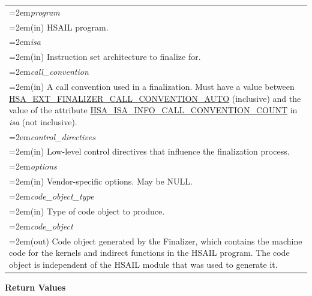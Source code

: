 \documentclass[final,oneside]{book}
\newcommand{\refarg}[1]{\textit{#1}}
\begin{document}
\noindent\begin{longtable}{@{}>{\hangindent=2em}p{\textwidth}}
\refarg{program}\\\hspace{2em}(in) HSAIL program.\\[2mm]
\refarg{isa}\\\hspace{2em}(in) Instruction set architecture to finalize for.\\[2mm]
\refarg{call_\-convention}\\\hspace{2em}(in) A call convention used in a finalization. Must have a value between \hyperlink{group__ext-alt-finalizer-program_1gga859463b7b8ac59d9ce2ec772333efa81a03a6dae23fb05ee289536df6b4f6bd63}{HSA_\-EXT_\-FINALIZER_\-CALL_\-CONVENTION_\-AUTO} (inclusive) and the value of the attribute \hyperlink{group__code-object_1ggaa8a09719dffad53bb3908b11ed25c1e4aa6d791d65444a479b8f393a9d7664ae8}{HSA_\-ISA_\-INFO_\-CALL_\-CONVENTION_\-COUNT} in \textit{isa} (not inclusive).\\[2mm]
\refarg{control_\-directives}\\\hspace{2em}(in) Low-level control directives that influence the finalization process.\\[2mm]
\refarg{options}\\\hspace{2em}(in) Vendor-specific options. May be NULL.\\[2mm]
\refarg{code_\-object_\-type}\\\hspace{2em}(in) Type of code object to produce.\\[2mm]
\refarg{code_\-object}\\\hspace{2em}(out) Code object generated by the Finalizer, which contains the machine code for the kernels and indirect functions in the HSAIL program. The code object is independent of the HSAIL module that was used to generate it.
\end{longtable}
\vspace{-2mm}\textbf{Return Values}\\[-7mm]
\end{document}
